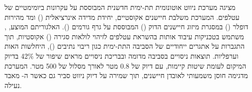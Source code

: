
 מציגה מערכת ניווט אוטונומית תת-ימית חדשנית המבוססת על עקרונות ביומימטיים של עטלפים. המערכת משלבת חיישנים אקוסטיים, יחידת מדידה אינרציאלית () ומד מהירות דופלר () במסגרת מיזוג חיישנים הדוק () המבוססת על גרף גורמים (). האלגוריתם המוצע, , משתמש בטכניקות עיבוד אותות בהשראת עטלפים לזיהוי לולאות סגירה () אקוסטיות, תוך התגברות על אתגרים ייחודיים של הסביבה התת-ימית כגון ריבוי נתיבים (), היחלשות האות וערפליות. תוצאות ניסויים בסביבה מדומה ובבריכת ניסויים מראים שיפור של 42\% בדיוק המיקום לעומת שיטות קיימות, עם דיוק של 0.8 מטר לאורך מסלול של 500 מטר. המערכת מדגימה חוסן משמעותי לאובדן חיישנים, תוך שמירה על דיוק ניווט סביר גם כאשר ה- מאבד נעילה.